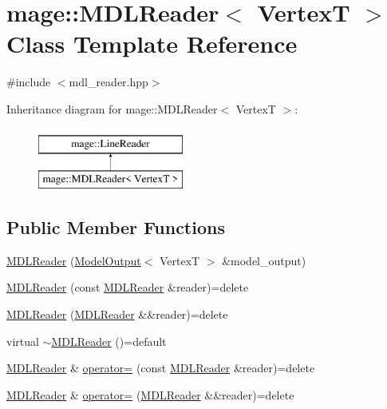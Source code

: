 \hypertarget{classmage_1_1_m_d_l_reader}{}\section{mage\+:\+:M\+D\+L\+Reader$<$ VertexT $>$ Class Template Reference}
\label{classmage_1_1_m_d_l_reader}


{\ttfamily \#include $<$mdl\+\_\+reader.\+hpp$>$}

Inheritance diagram for mage\+:\+:M\+D\+L\+Reader$<$ VertexT $>$\+:\begin{figure}[H]
\begin{center}
\leavevmode
\includegraphics[height=2.000000cm]{classmage_1_1_m_d_l_reader}
\end{center}
\end{figure}
\subsection*{Public Member Functions}
\begin{DoxyCompactItemize}
\item 
\hyperlink{classmage_1_1_m_d_l_reader_a068ed8c9101b42033ea166ab7aa03c04}{M\+D\+L\+Reader} (\hyperlink{structmage_1_1_model_output}{Model\+Output}$<$ VertexT $>$ \&model\+\_\+output)
\item 
\hyperlink{classmage_1_1_m_d_l_reader_ae7b3ee7b2b02101da041249e98f31bcc}{M\+D\+L\+Reader} (const \hyperlink{classmage_1_1_m_d_l_reader}{M\+D\+L\+Reader} \&reader)=delete
\item 
\hyperlink{classmage_1_1_m_d_l_reader_ac2e45fb05db0255d7ebf2da6e54db3f4}{M\+D\+L\+Reader} (\hyperlink{classmage_1_1_m_d_l_reader}{M\+D\+L\+Reader} \&\&reader)=delete
\item 
virtual \hyperlink{classmage_1_1_m_d_l_reader_a2da322d25dee1198ceb3c9455e5a51bf}{$\sim$\+M\+D\+L\+Reader} ()=default
\item 
\hyperlink{classmage_1_1_m_d_l_reader}{M\+D\+L\+Reader} \& \hyperlink{classmage_1_1_m_d_l_reader_a8cc5e9966283f3f9727fa28a75412ddb}{operator=} (const \hyperlink{classmage_1_1_m_d_l_reader}{M\+D\+L\+Reader} \&reader)=delete
\item 
\hyperlink{classmage_1_1_m_d_l_reader}{M\+D\+L\+Reader} \& \hyperlink{classmage_1_1_m_d_l_reader_a993c23d2e7f16f22a28e48ae9b7173b4}{operator=} (\hyperlink{classmage_1_1_m_d_l_reader}{M\+D\+L\+Reader} \&\&reader)=delete
\end{DoxyCompactItemize}
